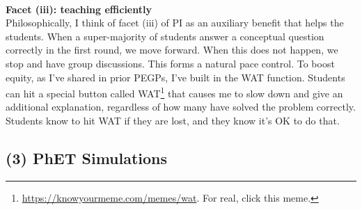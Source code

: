 \documentclass[../../../main.tex]{subfiles}
\begin{document}
\\
\vspace{0.15cm}
\textbf{Facet (iii): teaching efficiently}
\\
\vspace{0.15cm}
Philosophically, I think of facet (iii) of PI as an auxiliary benefit that helps the students.  When a super-majority of students answer a conceptual question correctly in the first round, we move forward.  When this does not happen, we stop and have group discussions.  This forms a natural pace control.  To boost equity, as I've shared in prior PEGPs, I've built in the WAT function.  Students can hit a special button called WAT\footnote{\url{https://knowyourmeme.com/memes/wat}.  For real, click this meme.} that causes me to slow down and give an additional explanation, regardless of how many have solved the problem correctly.  Students know to hit WAT if they are lost, and they know it's OK to do that.

\subsection{(3) PhET Simulations}
\end{document}
